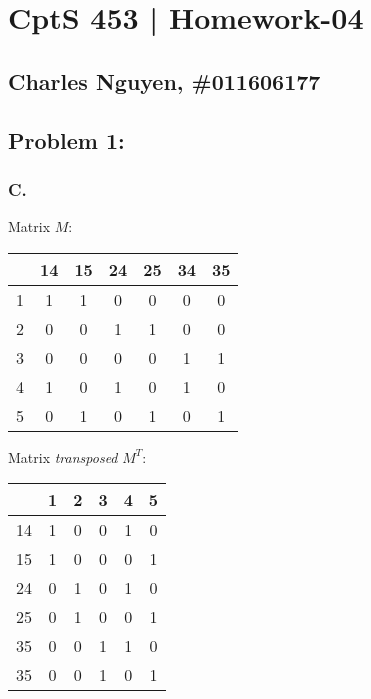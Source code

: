 \documentclass[12pt,letterpaper]{article}
\begin{document}
\section*{CptS 453 | Homework-04 }
\subsection*{Charles Nguyen, \#011606177 }

\subsection*{Problem 1:}
\subsubsection*{C.}
Matrix $M$:
\begin{flushright}
\begin{tabular}{|*{7}{c|}}
      \hline
      & 14 & 15 & 24 & 25 & 34 & 35\\
      \hline
    1 & 1  & 1  & 0  & 0  & 0  & 0\\
      \hline
    2 & 0  & 0  & 1  & 1  & 0  & 0\\
      \hline
    3 & 0  & 0  & 0  & 0  & 1  & 1\\
      \hline
    4 & 1  & 0  & 1  & 0  & 1  & 0\\
      \hline
    5 & 0  & 1  & 0  & 1  & 0  & 1\\
      \hline
\end{tabular}
\end{flushright}


Matrix \emph{transposed} $M^T$:
\begin{flushright}
\begin{tabular}{|*{6}{c|}}
      \hline
       & 1 & 2 & 3 & 4 & 5\\
      \hline
    14 & 1 & 0 & 0 & 1 & 0\\
      \hline
    15 & 1 & 0 & 0 & 0 & 1\\
      \hline
    24 & 0 & 1 & 0 & 1 & 0\\
      \hline
    25 & 0 & 1 & 0 & 0 & 1\\
      \hline
    35 & 0 & 0 & 1 & 1 & 0\\
      \hline
    35 & 0 & 0 & 1 & 0 & 1\\
      \hline
\end{tabular}
\end{flushright}
\end{document}
